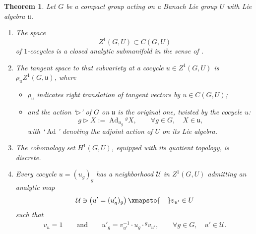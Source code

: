 \documentclass[pdftex]{sigma}
\numberwithin{equation}{section}
\newtheorem{Theorem}{Theorem}[section]
\newcommand\cU{{\mathcal U}}
\newcommand\fu{{\mathfrak u}}
\begin{document}
\begin{Theorem}\label{th:cocyle-man-1}
 Let $G$ be a compact group acting on a Banach Lie group $U$ with Lie algebra $\fu$.
 \begin{enumerate}[$(1)$]\itemsep=0pt
 \item\label{item:cocyle-man-1} The space
 \begin{equation*}
 Z^1(G,U)\subset C(G,U)
 \end{equation*}
 of $1$-cocycles is a closed analytic submanifold in the sense of {\rm \cite[\emph{Section}~5.8.3]{bourb-vars-17}}.

 \item\label{item:cocyle-man-1-tgz1} The tangent space to that subvariety at a cocycle $u\in Z^1(G,U)$ is $\rho_{u} Z^1(G,\fu)$, where
 \begin{itemize}\itemsep=0pt
 \item $\rho_{u}$ indicates right translation of tangent vectors by ${u}\in C(G,U)$;
 \item and the action `$\triangleright$' of $G$ on $\fu$ is the original one, twisted by the cocycle ${u}$:
 \begin{equation}\label{eq:defact}
 g\triangleright X:=\operatorname{Ad}_{u_g} {}^g X,\qquad \forall g\in G,\quad X\in \fu,
 \end{equation}
 with `$\operatorname{Ad}$' denoting the adjoint action of $U$ on its Lie algebra.
 \end{itemize}

 \item\label{item:cocyle-man-1-h1disc} The cohomology set $H^1(G,U)$, equipped with its quotient topology, is discrete.

\item\label{item:cocyle-man-1-coboundsplit} Every cocycle $u=(u_g)_g$ has a neighborhood $\cU$ in $Z^1(G,U)$ admitting an analytic map
 \begin{equation*}
 \cU\ni \left({u'}=(u'_g)_g\right)\xmapsto{\quad} v_{u'}\in U
 \end{equation*}
 such that
 \begin{align*}
 v_{u} =1\qquad\text{and}\qquad
 u'_g =v_{u'}^{-1}\cdot u_g\cdot {}^gv_{u'},\qquad \forall g\in G,\quad u'\in \cU.
 \end{align*}
 \end{enumerate}
\end{Theorem}
\end{document}
